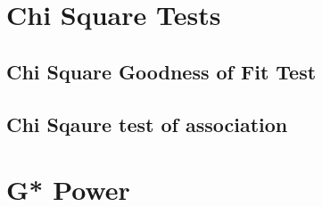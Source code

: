 \documentclass[
]{book}
\begin{document}
\hypertarget{chi-square-tests}{%
\chapter{Chi Square Tests}\label{chi-square-tests}}

\hypertarget{chi-square-goodness-of-fit-test}{%
\section{Chi Square Goodness of Fit Test}\label{chi-square-goodness-of-fit-test}}

\hypertarget{chi-sqaure-test-of-association}{%
\section{Chi Sqaure test of association}\label{chi-sqaure-test-of-association}}

\hypertarget{g-power}{%
\chapter{G* Power}\label{g-power}}

  
\end{document}

